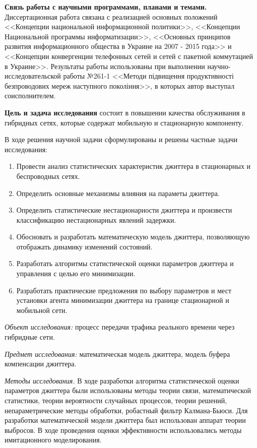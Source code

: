 \textbf{Связь работы с научными программами, планами и темами.} Диссертационная работа связана с реализацией основных положений <<Концепции национальной информационной политики>>, <<Концепции Национальной программы информатизации>>, <<Основных принципов развития информационного общества в Украине на 2007 - 2015 года>> и <<Концепции конвергенции телефонных сетей и сетей с пакетной коммутацией в Украине>>.
Результаты работы использованы при выполнении научно-исследовательской работы №261-1 <<Методи підвищення продуктивності безпроводових мереж наступного покоління>>, в которых автор выступал соисполнителем.

\textbf{Цель и задача исследования} состоит в повышении качества обслуживания в гибридных сетях, которые содержат мобильную и стационарную компоненту.

В ходе решения научной задачи сформулированы и решены частные задачи исследования:
\begin{enumerate}
  \item Провести анализ статистических характеристик джиттера в стационарных и беспроводных сетях.
  \item Определить основные механизмы влияния на параметы джиттера.
  \item Определить статистические нестационарности джиттера и произвести классификацию нестационарных явлений задержки.
  \item Обосновать и разработать математическую модель джиттера, позволяющую отображать динамику изменений состояний.
  \item Разработать алгоритмы статистической оценки параметров джиттера и управления с целью его минимизации.
  \item Разработать практические предложения по выбору параметров и мест установки агента минимизации джиттера на границе стационарной и мобильной сети.
\end{enumerate}

{\itshape Объект исследования:} процесс передачи трафика реального времени через гибридные сети.

{\itshape Предмет исследования:} математическая модель джиттера, модель буфера компенсации джиттера.

{\itshape Методы исследования.} 
В ходе разработки алгоритма статистической оценки параметров джиттера были использованы методы теории связи, математической статистики, теории вероятности случайных процессов, 
теории решений, непараметрические методы обработки, робастный фильтр Калмана-Бьюси. 
Для разработки математической модели джиттера был использован аппарат теории выбросов. 
В ходе проведения оценки эффективности использовались методы имитационного моделирования.


